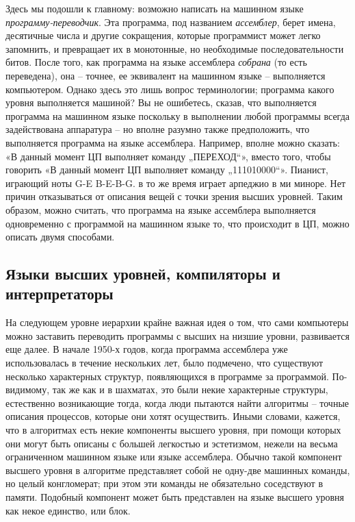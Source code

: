 \documentclass[../main.tex]{subfiles}
\begin{document}
Здесь мы подошли к главному: возможно написать на машинном языке \emph{программу-переводчик}. Эта программа, под названием \emph{ассемблер}, берет имена, десятичные числа и другие сокращения, которые программист может легко запомнить, и превращает их в монотонные, но необходимые последовательности битов. После того, как программа на языке ассемблера \emph{собрана} (то есть переведена), она \--- точнее, ее эквивалент на машинном языке \--- выполняется компьютером. Однако здесь это лишь вопрос терминологии; программа какого уровня выполняется машиной? Вы не ошибетесь, сказав, что выполняется программа на машинном языке поскольку в выполнении любой программы всегда задействована аппаратура \--- но вполне разумно также предположить, что выполняется программа на языке ассемблера. Например, вполне можно сказать: «В данный момент ЦП выполняет команду „ПЕРЕХОД``», вместо того, чтобы говорить «В данный момент ЦП выполняет команду „111010000``». Пианист, играющий ноты G-E B-E-B-G. в то же время играет арпеджио в ми миноре. Нет причин отказываться от описания вещей с точки зрения высших уровней. Таким образом, можно считать, что программа на языке ассемблера выполняется одновременно с программой на машинном языке то, что происходит в ЦП, можно описать двумя способами.


\subsection{Языки высших уровней, компиляторы и интерпретаторы}

На следующем уровне иерархии крайне важная идея о том, что сами компьютеры можно заставить переводить программы с высших на низшие уровни, развивается еще далее. В начале 1950-х годов, когда программа ассемблера уже использовалась в течение нескольких лет, было подмечено, что существуют несколько характерных структур, появляющихся в программе за программой. По-видимому, так же как и в шахматах, это были некие характерные структуры, естественно возникающие тогда, когда люди пытаются найти алгоритмы \--- точные описания процессов, которые они хотят осуществить. Иными словами, кажется, что в алгоритмах есть некие компоненты высшего уровня, при помощи которых они могут быть описаны с большей легкостью и эстетизмом, нежели на весьма ограниченном машинном языке или языке ассемблера. Обычно такой компонент высшего уровня в алгоритме представляет собой не одну-две машинных команды, но целый конгломерат; при этом эти команды не обязательно соседствуют в памяти. Подобный компонент может быть представлен на языке высшего уровня как некое единство, или блок.
\end{document}
